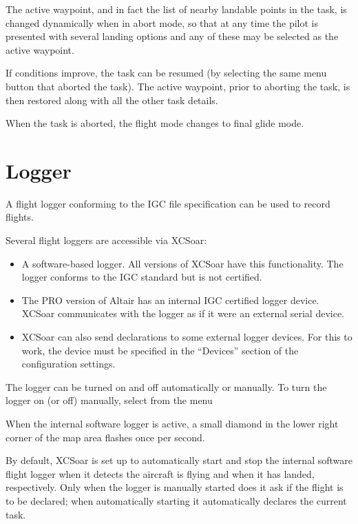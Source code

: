 \documentclass[a4paper,12pt]{refrep}
\begin{document}
The active waypoint, and in fact the list of nearby landable points in
the task, is changed dynamically when in abort mode, so that at any
time the pilot is presented with several landing options and any of
these may be selected as the active waypoint.

If conditions improve, the task can be resumed (by selecting the same
menu button that aborted the task).  The active waypoint, prior to
aborting the task, is then restored along with all the other task
details.

When the task is aborted, the flight mode changes to final glide mode.

\section{Logger}

A flight logger conforming to the IGC file specification can be used
to record flights.  

Several flight loggers are accessible via XCSoar:
\begin{itemize}
\item A software-based logger.  All versions of XCSoar have this
  functionality.  The logger conforms to the IGC standard but is not
  certified.
\item The PRO version of Altair has an internal IGC certified logger device.
  XCSoar communicates with the logger as if it were an external serial device.


\item XCSoar can also send declarations to some external logger devices. 
For this to work, the device must be specified in the ``Devices'' 
section of the configuration  settings.
\end{itemize}

The logger can be turned on and off automatically or manually.  
To turn the logger on (or off) manually, select from the menu
\begin{quote}
\blink{}\blink{}
\end{quote}

When the internal software logger is active, a small diamond in the
lower right corner of the map area flashes once per second.

By default, XCSoar is set up to automatically start and stop the
internal software flight logger when it detects the aircraft is flying
and when it has landed, respectively.  Only when the logger is
manually started does it ask if the flight is to be declared; when
automatically starting it automatically declares the current task.
\end{document}
